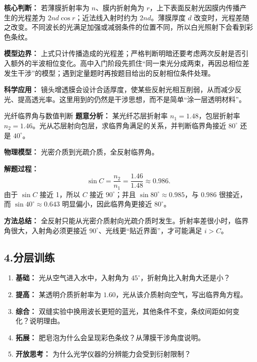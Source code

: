 \textbf{核心判断：} 若薄膜折射率为 $n$、膜内折射角为 $r$，上下表面反射光因膜内传播产生的光程差为 $2nd\cos r$；近法线入射时约为 $2nd$。薄膜厚度 $d$ 改变时，光程差随之改变。不同波长的光满足加强或减弱条件的位置不同，所以白光照射下会看到彩色条纹。

\textbf{模型边界：} 上式只计传播造成的光程差；严格判断明暗还要考虑两次反射是否引入额外的半波相位变化。高中入门阶段先抓住“同一束光分成两束，再因总相位差发生干涉”的模型；遇到定量题时再按题目给出的反射相位条件处理。

\textbf{科学应用：} 镜头增透膜会设计合适厚度，使某些反射光相互削弱，从而减少反光、提高透光率。这里用到的仍然是干涉思想，而不是简单“涂一层透明材料”。

\begin{examplebox}{光纤临界角与数值判断}
\textbf{题意分析：} 某光纤芯层折射率 $n_1=1.48$，包层折射率 $n_2=1.46$。光从芯层射向包层，求临界角满足的关系，并判断临界角接近 $80^\circ$ 还是 $40^\circ$。

\textbf{物理模型：} 光密介质到光疏介质，全反射临界角。

\textbf{解题过程：}
\[
\sin C=\frac{n_2}{n_1}=\frac{1.46}{1.48}\approx0.986.
\]
由于 $\sin C$ 接近 1，所以 $C$ 接近 $90^\circ$；并且 $\sin80^\circ\approx0.985$，与 $0.986$ 很接近，而 $\sin40^\circ\approx0.643$ 明显偏小，因此临界角更接近 $80^\circ$。

\textbf{方法总结：} 全反射只能从光密介质射向光疏介质时发生。折射率差很小时，临界角很大，入射角必须更接近 $90^\circ$、光线更“贴近界面”，才可能满足 $i>C$。
\end{examplebox}

\subsection*{4.\quad 分层训练}

\begin{enumerate}
  \item \textbf{基础：} 光从空气进入水中，入射角为 $45^\circ$，折射角比入射角大还是小？
  \item \textbf{提高：} 某透明介质折射率为 $1.60$，光从该介质射向空气，写出临界角方程。
  \item \textbf{综合：} 双缝实验中换用波长更短的蓝光，其他条件不变，条纹间距如何变化？说明理由。
  \item \textbf{拓展：} 肥皂泡为什么会呈现彩色条纹？从薄膜干涉角度说明。
  \item \textbf{开放思考：} 为什么光学仪器的分辨能力会受到衍射限制？
\end{enumerate}

